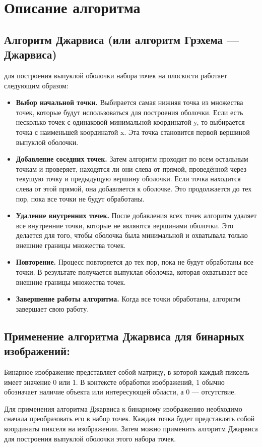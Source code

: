\documentclass[12pt]{article}
\begin{document}
\section*{Описание алгоритма}
\subsection*{Алгоритм Джарвиса (или алгоритм Грэхема — Джарвиса)} для построения выпуклой оболочки набора точек на плоскости работает следующим образом:
\begin{itemize}
\item  \textbf{Выбор начальной точки.} Выбирается самая нижняя точка из множества точек, которые будут использоваться для построения оболочки. Если есть несколько точек с одинаковой минимальной координатой y, то выбирается точка с наименьшей координатой x. Эта точка становится первой вершиной выпуклой оболочки.
\item  \textbf{Добавление соседних точек.} Затем алгоритм проходит по всем остальным точкам и проверяет, находятся ли они слева от прямой, проведённой через текущую точку и предыдущую вершину оболочки. Если точка находится слева от этой прямой, она добавляется к оболочке. Это продолжается до тех пор, пока все точки не будут обработаны.
\item \textbf{Удаление внутренних точек.} После добавления всех точек алгоритм удаляет все внутренние точки, которые не являются вершинами оболочки. Это делается для того, чтобы оболочка была минимальной и охватывала только внешние границы множества точек.
\item  \textbf{Повторение.} Процесс повторяется до тех пор, пока не будут обработаны все точки. В результате получается выпуклая оболочка, которая охватывает все внешние границы множества точек. 
\item  \textbf{Завершение работы алгоритма.} Когда все точки обработаны, алгоритм завершает свою работу.
\end{itemize}
\subsection*{Применение алгоритма Джарвиса для бинарных изображений:}

Бинарное изображение представляет собой матрицу, в которой каждый пиксель имеет значение 0 или 1. В контексте обработки изображений, 1 обычно обозначает наличие объекта или интересующей области, а 0 — отсутствие.

Для применения алгоритма Джарвиса к бинарному изображению необходимо сначала преобразовать его в набор точек. Каждая точка будет представлять собой координаты пикселя на изображении. Затем можно применить алгоритм Джарвиса для построения выпуклой оболочки этого набора точек.
\end{document}
